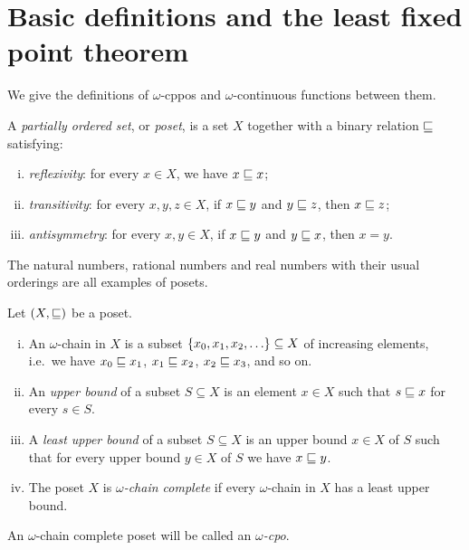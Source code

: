 \section{Basic definitions and the least fixed point theorem}

We give the definitions of \(\omega\)-cppos and \(\omega\)-continuous functions
between them.

\begin{definition}[Poset]
  A \emph{partially ordered set}, or \emph{poset}, is a set \(X\) together with
  a binary relation \({\sqsubseteq}\) satisfying:
  \begin{enumerate}[(i)]
  \item \emph{reflexivity}: for every \(x \in X\), we have \(x \sqsubseteq x\);
  \item \emph{transitivity}: for every \(x,y,z \in X\), if \(x \sqsubseteq y\) and
    \(y \sqsubseteq z\), then \(x \sqsubseteq z\);
  \item \emph{antisymmetry}: for every \(x,y \in X\), if \(x \sqsubseteq y\) and
    \(y \sqsubseteq x\), then \(x = y\).
  \end{enumerate}
\end{definition}

\begin{example}
  The natural numbers, rational numbers and real numbers with their usual
  orderings are all examples of posets.
\end{example}

\begin{definition}
  Let \((X,{\sqsubseteq})\) be a poset.
  \begin{enumerate}[(i)]
  \item An \(\omega\)-chain in \(X\) is a subset
    \(\set{x_0,x_1,x_2,\dots} \subseteq X\) of increasing elements, i.e.\ we
    have \(x_0 \sqsubseteq x_1\), \(x_1 \sqsubseteq x_2\), \(x_2 \sqsubseteq x_3\), and so
    on.%
  \item An \emph{upper bound} of a subset \(S \subseteq X\) is an element
    \(x \in X\) such that \(s \sqsubseteq x\) for every \(s \in S\).
  \item A \emph{least upper bound} of a subset \(S \subseteq X\) is an upper
    bound \(x \in X\) of \(S\) such that for every upper bound \(y \in X\) of
    \(S\) we have \(x \sqsubseteq y\).
  \item The poset \(X\) is \emph{\(\omega\)-chain complete} if every
    \(\omega\)-chain in \(X\) has a least upper bound.%
  \end{enumerate}
  An \(\omega\)-chain complete poset will be called an \emph{\(\omega\)-cpo}.
\end{definition}

